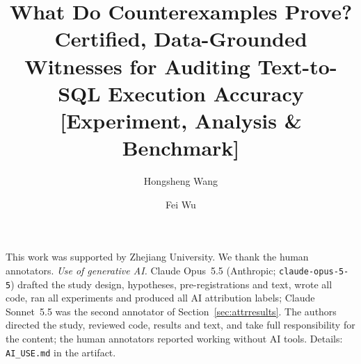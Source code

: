 \documentclass[sigconf, nonacm]{acmart}
\begin{document}
\title{What Do Counterexamples Prove? Certified, Data-Grounded Witnesses for Auditing Text-to-SQL Execution Accuracy [Experiment, Analysis \& Benchmark]}

\author{Hongsheng Wang}

\author{Fei Wu}



\maketitle

\vldbtopmatter











\begin{acks}
This work was supported by Zhejiang University. We thank the human annotators. \emph{Use of generative AI.} Claude Opus~5.5 (Anthropic; \texttt{claude-opus-5-5}) drafted the study design, hypotheses, pre-registrations and text, wrote all code, ran all experiments and produced all AI attribution labels; Claude Sonnet~5.5 was the second annotator of Section~\ref{sec:attrresults}. The authors directed the study, reviewed code, results and text, and take full responsibility for the content; the human annotators reported working without AI tools. Details: \texttt{AI\_USE.md} in the artifact.
\end{acks}
\label{lastbodypage}



\end{document}
